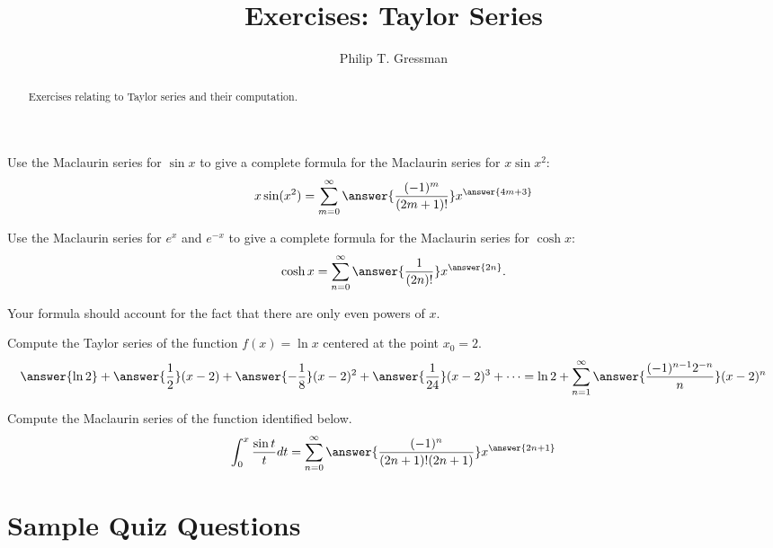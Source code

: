 \documentclass{ximera}
\title{Exercises: Taylor Series}
\author{Philip T. Gressman}
\begin{document}
\begin{abstract}
Exercises relating to Taylor series and their computation.
\end{abstract}
\maketitle


\begin{exercise}
Use the Maclaurin series for $\sin x$ to give a complete formula for the Maclaurin series for $x \sin x^2$:
\[ x \sin (x^2) = \sum_{m=0}^\infty  \answer{\frac{(-1)^m}{(2m+1)!}} x^{\answer{4m+3}} \]
\end{exercise}

\begin{exercise}
Use the Maclaurin series for $e^x$ and $e^{-x}$ to give a complete formula for the Maclaurin series for $\cosh x$:
\[ \cosh x = \sum_{n=0}^\infty \answer{\frac{1}{(2n)!}} x^{\answer{2n}}. \]
\begin{hint}
Your formula should account for the fact that there are only even powers of $x$.
\end{hint}
\end{exercise}

\begin{exercise}
Compute the Taylor series of the function $f(x) = \ln x$ centered at the point $x_0 = 2$.
\[ \answer{ \ln 2} + \answer{\frac{1}{2}} (x-2) + \answer{- \frac{1}{8}}(x-2)^2 + \answer{\frac{1}{24}}(x-2)^3 + \cdots = \ln 2 + \sum_{n=1}^\infty \answer{\frac{(-1)^{n-1}2^{-n}}{n}} (x-2)^n \]
\end{exercise}


\begin{exercise}
Compute the Maclaurin series of the function identified below.
\[ \int_0^x \frac{\sin t}{t} dt = \sum_{n=0}^\infty \answer{\frac{(-1)^n}{(2n+1)! (2n+1)}} x^{\answer{2n+1}} \]
\end{exercise}

\section*{Sample Quiz Questions}
\end{document}
